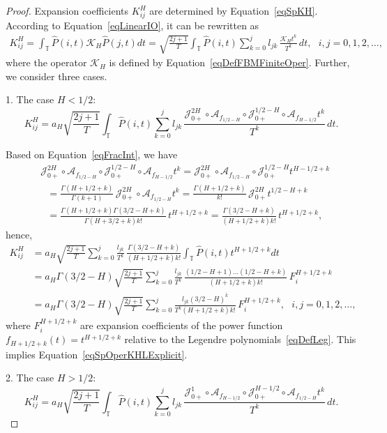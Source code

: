 \documentclass[10pt,reqno]{amsart}
\theoremstyle{plain}
\theoremstyle{remark}
\newcommand{\ca}{\mathcal{A}}
\newcommand{\cj}{\mathcal{J}}
\newcommand{\ck}{\mathcal{K}}
\begin{document}
\begin{proof}
Expansion coefficients $K_{ij}^H$ are determined by Equation~\eqref{eqSpKH}. According to Equation~\eqref{eqLinearIO}, it can be rewritten as
\begin{align*}
  K_{ij}^H = \int_\mathds{T} \hat P(i,t) \ck_H \hat P(j,t) dt = \sqrt{\frac{2j+1}{T}} \int_\mathds{T} {\hat P(i,t) \sum\limits_{k=0}^j {l_{jk} \, \frac{\ck_H t^k}{T^k}} \, dt}, \ \ \ i,j = 0,1,2,\dots,
\end{align*}
where the operator $\ck_H$ is defined by Equation~\eqref{eqDefFBMFiniteOper}. Further, we consider three cases.

1. The case $H < 1/2$:
\[
  K_{ij}^H = a_H \sqrt{\frac{2j+1}{T}} \int_\mathds{T} {\hat P(i,t) \sum\limits_{k=0}^j {l_{jk} \, \frac{\cj_{0+}^{2H} \circ \ca_{f_{1/2-H}} \circ \cj_{0+}^{1/2-H} \circ \ca_{f_{H-1/2}} t^k}{T^k}} \, dt}.
\]

Based on Equation~\eqref{eqFracInt}, we have
\begin{align*}
  & \cj_{0+}^{2H} \circ \ca_{f_{1/2-H}} \circ \cj_{0+}^{1/2-H} \circ \ca_{f_{H-1/2}} t^k = \cj_{0+}^{2H} \circ \ca_{f_{1/2-H}} \circ \cj_{0+}^{1/2-H} t^{H-1/2+k} \\
  & \ \ \ = \frac{\Gamma(H+1/2+k)}{\Gamma(k+1)} \, \cj_{0+}^{2H} \circ \ca_{f_{1/2-H}} t^k = \frac{\Gamma(H+1/2+k)}{k!} \, \cj_{0+}^{2H} t^{1/2-H+k} \\
  & \ \ \ = \frac{\Gamma(H+1/2+k) \Gamma(3/2-H+k)}{\Gamma(H+3/2+k) k!} \, t^{H+1/2+k} = \frac{\Gamma(3/2-H+k)}{(H+1/2+k) k!} \, t^{H+1/2+k},
\end{align*}
hence,
\begin{align*}
  K_{ij}^H & = a_H \sqrt{\frac{2j+1}{T}} \sum\limits_{k=0}^j \frac{l_{jk}}{T^k} \, \frac{\Gamma(3/2-H+k)}{(H+1/2+k) k!} \int_\mathds{T} {\hat P(i,t) t^{H+1/2+k} dt} \\
  & = a_H \Gamma(3/2-H) \sqrt{\frac{2j+1}{T}} \sum\limits_{k=0}^j \frac{l_{jk}}{T^k} \, \frac{(1/2-H+1) \ldots (1/2-H+k)}{(H+1/2+k) k!} \, F_i^{H+1/2+k} \\
  & = a_H \Gamma(3/2-H) \sqrt{\frac{2j+1}{T}} \sum\limits_{k=0}^j \frac{l_{jk} (3/2-H)^{\overline{k}}}{T^k (H+1/2+k) k!} \, F_i^{H+1/2+k}, \ \ \ i,j = 0,1,2,\dots,
\end{align*}
where $F_i^{H+1/2+k}$ are expansion coefficients of the power function $f_{H+1/2+k}(t) = t^{H+1/2+k}$ relative to the Legendre polynomials~\eqref{eqDefLeg}. This implies Equation~\eqref{eqSpOperKHLExplicit}.

2. The case $H > 1/2$:
\[
  K_{ij}^H = a_H \sqrt{\frac{2j+1}{T}} \int_\mathds{T} {\hat P(i,t) \sum\limits_{k=0}^j {l_{jk} \, \frac{\cj_{0+}^1 \circ \ca_{f_{H-1/2}} \circ \cj_{0+}^{H-1/2} \circ \ca_{f_{1/2-H}} t^k}{T^k}} \, dt}.
\]


\end{proof}
\end{document}
